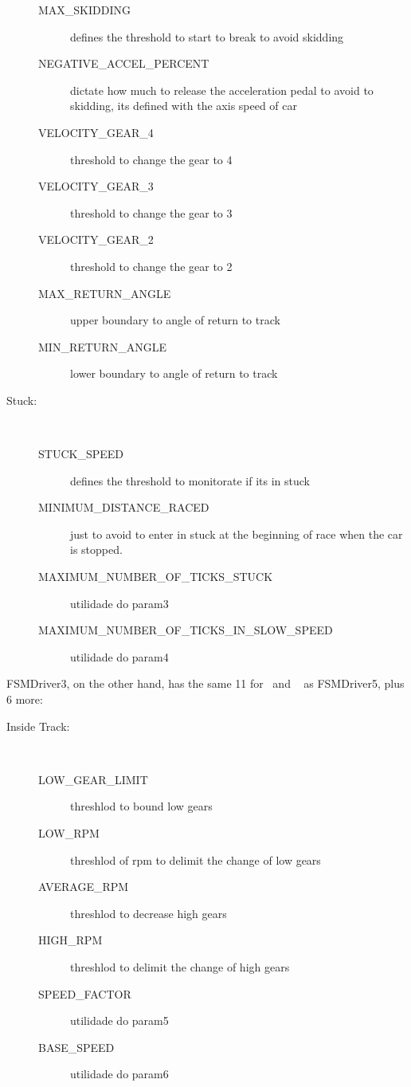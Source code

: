 \begin{description}
	\begin{description}
		\item[MAX\_SKIDDING] defines the threshold to start to break to avoid skidding
		\item[NEGATIVE\_ACCEL\_PERCENT] dictate how much to release the acceleration pedal to avoid to skidding, its defined with the axis speed of car
		\item[VELOCITY\_GEAR\_4] threshold to change the gear to 4
		\item[VELOCITY\_GEAR\_3] threshold to change the gear to 3
		\item[VELOCITY\_GEAR\_2] threshold to change the gear to 2
		\item[MAX\_RETURN\_ANGLE] upper boundary to angle of return to track
		\item[MIN\_RETURN\_ANGLE] lower boundary to angle of return to track
	\end{description}
	\item[Stuck:] \ %
	\begin{description}
		\item[STUCK\_SPEED] defines the threshold to monitorate if its in stuck
		\item[MINIMUM\_DISTANCE\_RACED] just to avoid to enter in stuck at the beginning of race when the car is stopped.
		\item[MAXIMUM\_NUMBER\_OF\_TICKS\_STUCK] utilidade do param3
		\item[MAXIMUM\_NUMBER\_OF\_TICKS\_IN\_SLOW\_SPEED] utilidade do param4
	\end{description}
\end{description}

FSMDriver3, on the other hand, has the same 11 for \OT~and \St~ as FSMDriver5, plus 6 more:

\begin{description}
	\item[Inside Track:] \ %
	\begin{description}
		\item[LOW\_GEAR\_LIMIT] threshlod to bound low gears
		\item[LOW\_RPM] threshlod of rpm to delimit the change of low gears
		\item[AVERAGE\_RPM] threshlod to decrease high gears
		\item[HIGH\_RPM] threshlod to delimit the change of high gears
		\item[SPEED\_FACTOR] utilidade do param5
		\item[BASE\_SPEED] utilidade do param6
	\end{description}
\end{description}

